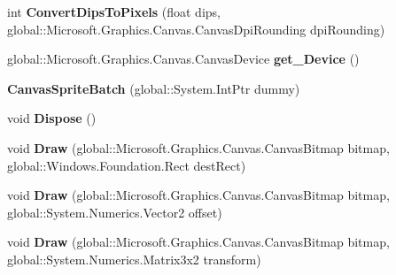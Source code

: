 \begin{DoxyCompactItemize}
int {\bfseries Convert\+Dips\+To\+Pixels} (float dips, global\+::\+Microsoft.\+Graphics.\+Canvas.\+Canvas\+Dpi\+Rounding dpi\+Rounding)
\item 
\mbox{\label{class_microsoft_1_1_graphics_1_1_canvas_1_1_canvas_sprite_batch_a6a382f246e096c28933db88bf3b579f7}} 
global\+::\+Microsoft.\+Graphics.\+Canvas.\+Canvas\+Device {\bfseries get\+\_\+\+Device} ()
\item 
\mbox{\label{class_microsoft_1_1_graphics_1_1_canvas_1_1_canvas_sprite_batch_a81340af827697e7a6d22bf42fc032c21}} 
{\bfseries Canvas\+Sprite\+Batch} (global\+::\+System.\+Int\+Ptr dummy)
\item 
\mbox{\label{class_microsoft_1_1_graphics_1_1_canvas_1_1_canvas_sprite_batch_af897e58d6cf8ed4ca4efaee7c5f9a12a}} 
void {\bfseries Dispose} ()
\item 
\mbox{\label{class_microsoft_1_1_graphics_1_1_canvas_1_1_canvas_sprite_batch_a5b0eff0bf7714bbaebd5c698e9a4926d}} 
void {\bfseries Draw} (global\+::\+Microsoft.\+Graphics.\+Canvas.\+Canvas\+Bitmap bitmap, global\+::\+Windows.\+Foundation.\+Rect dest\+Rect)
\item 
\mbox{\label{class_microsoft_1_1_graphics_1_1_canvas_1_1_canvas_sprite_batch_a8d4101527222c749dcfd590c5306aeb7}} 
void {\bfseries Draw} (global\+::\+Microsoft.\+Graphics.\+Canvas.\+Canvas\+Bitmap bitmap, global\+::\+System.\+Numerics.\+Vector2 offset)
\item 
\mbox{\label{class_microsoft_1_1_graphics_1_1_canvas_1_1_canvas_sprite_batch_a65cba582c2a39f5ba39b6b335f662889}} 
void {\bfseries Draw} (global\+::\+Microsoft.\+Graphics.\+Canvas.\+Canvas\+Bitmap bitmap, global\+::\+System.\+Numerics.\+Matrix3x2 transform)
\item 
\mbox{\label{class_microsoft_1_1_graphics_1_1_canvas_1_1_canvas_sprite_batch_ac6a57c21e98d51e115cc80bfc708824f}} 

\end{DoxyCompactItemize}
